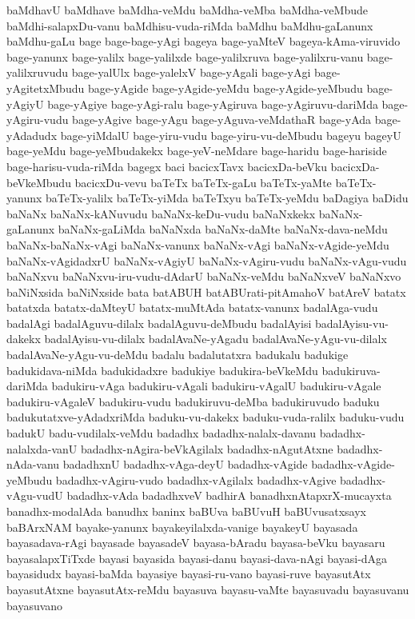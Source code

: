 {baMdhavU
baMdhave
baMdha-veMdu
baMdha-veMba
baMdha-veMbude
baMdhi-salapxDu-vanu
baMdhisu-vuda-riMda
baMdhu
baMdhu-gaLanunx
baMdhu-gaLu
bage
bage-bage-yAgi
bageya
bage-yaMteV
bageya-kAma-viruvido
bage-yanunx
bage-yalilx
bage-yalilxde
bage-yalilxruva
bage-yalilxru-vanu
bage-yalilxruvudu
bage-yalUlx
bage-yalelxV
bage-yAgali
bage-yAgi
bage-yAgitetxMbudu
bage-yAgide
bage-yAgide-yeMdu
bage-yAgide-yeMbudu
bage-yAgiyU
bage-yAgiye
bage-yAgi-ralu
bage-yAgiruva
bage-yAgiruvu-dariMda
bage-yAgiru-vudu
bage-yAgive
bage-yAgu
bage-yAguva-veMdathaR
bage-yAda
bage-yAdadudx
bage-yiMdalU
bage-yiru-vudu
bage-yiru-vu-deMbudu
bageyu
bageyU
bage-yeMdu
bage-yeMbudakekx
bage-yeV-neMdare
bage-haridu
bage-hariside
bage-harisu-vuda-riMda
bagegx
baci
bacicxTavx
bacicxDa-beVku
bacicxDa-beVkeMbudu
bacicxDu-vevu
baTeTx
baTeTx-gaLu
baTeTx-yaMte
baTeTx-yanunx
baTeTx-yalilx
baTeTx-yiMda
baTeTxyu
baTeTx-yeMdu
baDagiya
baDidu
baNaNx
baNaNx-kANuvudu
baNaNx-keDu-vudu
baNaNxkekx
baNaNx-gaLanunx
baNaNx-gaLiMda
baNaNxda
baNaNx-daMte
baNaNx-dava-neMdu
baNaNx-baNaNx-vAgi
baNaNx-vanunx
baNaNx-vAgi
baNaNx-vAgide-yeMdu
baNaNx-vAgidadxrU
baNaNx-vAgiyU
baNaNx-vAgiru-vudu
baNaNx-vAgu-vudu
baNaNxvu
baNaNxvu-iru-vudu-dAdarU
baNaNx-veMdu
baNaNxveV
baNaNxvo
baNiNxsida
baNiNxside
bata
batABUH
batABUrati-pitAmahoV
batAreV
batatx
batatxda
batatx-daMteyU
batatx-muMtAda
batatx-vanunx
badalAga-vudu
badalAgi
badalAguvu-dilalx
badalAguvu-deMbudu
badalAyisi
badalAyisu-vu-dakekx
badalAyisu-vu-dilalx
badalAvaNe-yAgadu
badalAvaNe-yAgu-vu-dilalx
badalAvaNe-yAgu-vu-deMdu
badalu
badalutatxra
badukalu
badukige
badukidava-niMda
badukidadxre
badukiye
badukira-beVkeMdu
badukiruva-dariMda
badukiru-vAga
badukiru-vAgali
badukiru-vAgalU
badukiru-vAgale
badukiru-vAgaleV
badukiru-vudu
badukiruvu-deMba
badukiruvudo
baduku
badukutatxve-yAdadxriMda
baduku-vu-dakekx
baduku-vuda-ralilx
baduku-vudu
badukU
badu-vudilalx-veMdu
badadhx
badadhx-nalalx-davanu
badadhx-nalalxda-vanU
badadhx-nAgira-beVkAgilalx
badadhx-nAgutAtxne
badadhx-nAda-vanu
badadhxnU
badadhx-vAga-deyU
badadhx-vAgide
badadhx-vAgide-yeMbudu
badadhx-vAgiru-vudo
badadhx-vAgilalx
badadhx-vAgive
badadhx-vAgu-vudU
badadhx-vAda
badadhxveV
badhirA
banadhxnAtapxrX-mucayxta
banadhx-modalAda
banudhx
baninx
baBUva
baBUvuH
baBUvusatxsayx
baBArxNAM
bayake-yanunx
bayakeyilalxda-vanige
bayakeyU
bayasada
bayasadava-rAgi
bayasade
bayasadeV
bayasa-bAradu
bayasa-beVku
bayasaru
bayasalapxTiTxde
bayasi
bayasida
bayasi-danu
bayasi-dava-nAgi
bayasi-dAga
bayasidudx
bayasi-baMda
bayasiye
bayasi-ru-vano
bayasi-ruve
bayasutAtx
bayasutAtxne
bayasutAtx-reMdu
bayasuva
bayasu-vaMte
bayasuvadu
bayasuvanu
bayasuvano
}
